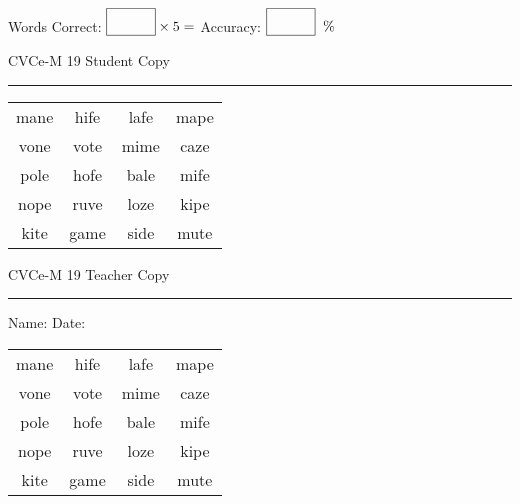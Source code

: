 \documentclass{memoir}
\begin{document}
\small

Words Correct: $\fbox{\phantom{\huge 100}} \times 5 = $ Accuracy: $\fbox{\phantom{\huge 100}}\;\; \%$ 

\vfill

\newpage


\footnotesize \noindent
CVCe-M 19 \hfill Student Copy
\smallskip
\hrule

\Large

\setlength{\tabcolsep}{14pt}
\def\arraystretch{2}

{\selectfont


\begin{vplace}[0.5]
\begin{center}
\begin{tabular}{cccc}
mane & hife & lafe & mape \\
vone & vote & mime & caze \\
pole & hofe & bale & mife \\
nope & ruve & loze & kipe \\
kite & game & side & mute \\
\end{tabular}
\end{center}
\end{vplace}

}

\newpage

\footnotesize \noindent
CVCe-M 19 \hfill Teacher Copy
\smallskip
\hrule

\small

\vfill

\noindent
Name: \underline{\hspace{1.75in}} \hfill Date: \underline{\hspace{1in}}

\Large

{\selectfont


\begin{vplace}[0.5]
\begin{center}
\begin{tabular}{cccc}
mane & hife & lafe & mape \\
vone & vote & mime & caze \\
pole & hofe & bale & mife \\
nope & ruve & loze & kipe \\
kite & game & side & mute \\
\end{tabular}
\end{center}
\end{vplace}



}
\end{document}
